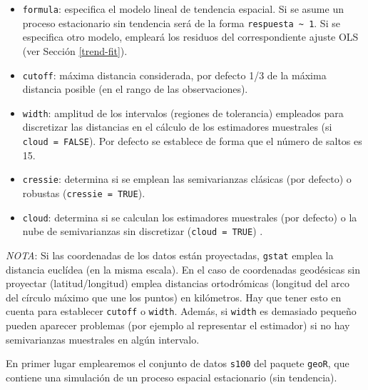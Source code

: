 \documentclass[
]{book}
\newenvironment{Shaded}{\begin{snugshade}}{\end{snugshade}}
\newcommand{\AttributeTok}[1]{\textcolor[rgb]{0.13,0.29,0.53}{#1}}
\newcommand{\CommentTok}[1]{\textcolor[rgb]{0.56,0.35,0.01}{\textit{#1}}}
\newcommand{\DecValTok}[1]{\textcolor[rgb]{0.00,0.00,0.81}{#1}}
\newcommand{\FunctionTok}[1]{\textcolor[rgb]{0.13,0.29,0.53}{\textbf{#1}}}
\newcommand{\NormalTok}[1]{#1}
\newcommand{\OtherTok}[1]{\textcolor[rgb]{0.56,0.35,0.01}{#1}}
\newcommand{\SpecialCharTok}[1]{\textcolor[rgb]{0.81,0.36,0.00}{\textbf{#1}}}
\newcommand{\StringTok}[1]{\textcolor[rgb]{0.31,0.60,0.02}{#1}}
\theoremstyle{break}
\theoremstyle{definition}
\theoremstyle{definition}
\theoremstyle{definition}
\theoremstyle{definition}
\theoremstyle{remark}
\begin{document}
\begin{itemize}
\item
  \texttt{formula}: especifica el modelo lineal de tendencia espacial. Si se asume un proceso estacionario sin tendencia será de la forma \texttt{respuesta\ \textasciitilde{}\ 1}. Si se especifica otro modelo, empleará los residuos del correspondiente ajuste OLS (ver Sección \ref{trend-fit}).
\item
  \texttt{cutoff}: máxima distancia considerada, por defecto 1/3 de la máxima distancia posible (en el rango de las observaciones).
\item
  \texttt{width}: amplitud de los intervalos (regiones de tolerancia) empleados para discretizar las distancias en el cálculo de los estimadores muestrales (si \texttt{cloud\ =\ FALSE}). Por defecto se establece de forma que el número de saltos es 15.
\item
  \texttt{cressie}: determina si se emplean las semivarianzas clásicas (por defecto) o robustas (\texttt{cressie\ =\ TRUE}).
\item
  \texttt{cloud}: determina si se calculan los estimadores muestrales (por defecto) o la nube de semivarianzas sin discretizar (\texttt{cloud\ =\ TRUE}) .
\end{itemize}

\emph{NOTA}: Si las coordenadas de los datos están proyectadas, \texttt{gstat} emplea la distancia euclídea (en la misma escala). En el caso de coordenadas geodésicas sin proyectar (latitud/longitud) emplea distancias ortodrómicas (longitud del arco del círculo máximo que une los puntos) en kilómetros.
Hay que tener esto en cuenta para establecer \texttt{cutoff} o \texttt{width}.
Además, si \texttt{width} es demasiado pequeño pueden aparecer problemas (por ejemplo al representar el estimador) si no hay semivarianzas muestrales en algún intervalo.

En primer lugar emplearemos el conjunto de datos \texttt{s100} del paquete \texttt{geoR}, que contiene una simulación de un proceso espacial estacionario (sin tendencia).

\begin{Shaded}
\end{Shaded}
\end{document}

